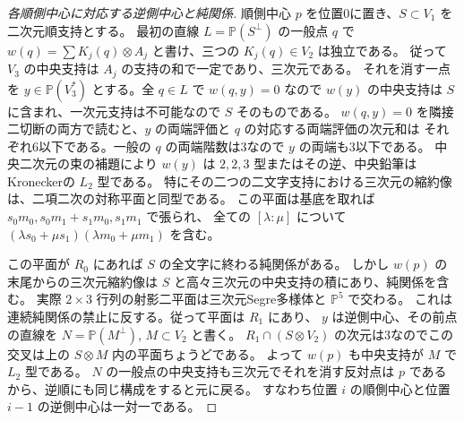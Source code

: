 \begin{proof}[各順側中心に対応する逆側中心と純関係]
順側中心 $p$ を位置0に置き、$S\subset V_1$ を二次元順支持とする。
最初の直線 $L=\mathbb P(S^\perp)$ の一般点 $q$ で
$w(q)=\sum K_j(q)\otimes A_j$ と書け、三つの $K_j(q)\in V_2$ は独立である。
従って $V_3$ の中央支持は $A_j$ の支持の和で一定であり、三次元である。
それを消す一点を $y\in\mathbb P(V_3^*)$ とする。全 $q\in L$ で $w(q,y)=0$ なので
$w(y)$ の中央支持は $S$ に含まれ、一次元支持は不可能なので $S$ そのものである。
$w(q,y)=0$ を隣接二切断の両方で読むと、$y$ の両端評価と $q$ の対応する両端評価の次元和は
それぞれ6以下である。一般の $q$ の両端階数は3なので $y$ の両端も3以下である。
中央二次元の束の補題により $w(y)$ は $2,2,3$ 型またはその逆、中央鉛筆はKroneckerの $L_2$ 型である。
特にその二つの二文字支持における三次元の縮約像は、二項二次の対称平面と同型である。
この平面は基底を取れば $s_0m_0,s_0m_1+s_1m_0,s_1m_1$ で張られ、
全ての $[\lambda:\mu]$ について $(\lambda s_0+\mu s_1)(\lambda m_0+\mu m_1)$ を含む。

この平面が $R_0$ にあれば $S$ の全文字に終わる純関係がある。
しかし $w(p)$ の末尾からの三次元縮約像は $S$ と高々三次元の中央支持の積にあり、純関係を含む。
実際 $2\times3$ 行列の射影二平面は三次元Segre多様体と $\mathbb P^5$ で交わる。
これは連続純関係の禁止に反する。従って平面は $R_1$ にあり、
$y$ は逆側中心、その前点の直線を $N=\mathbb P(M^\perp)$, $M\subset V_2$ と書く。
$R_1\cap(S\otimes V_2)$ の次元は3なのでこの交叉は上の $S\otimes M$ 内の平面ちょうどである。
よって $w(p)$ も中央支持が $M$ で $L_2$ 型である。
$N$ の一般点の中央支持も三次元でそれを消す反対点は $p$ であるから、逆順にも同じ構成をすると元に戻る。
すなわち位置 $i$ の順側中心と位置 $i-1$ の逆側中心は一対一である。
\end{proof}

